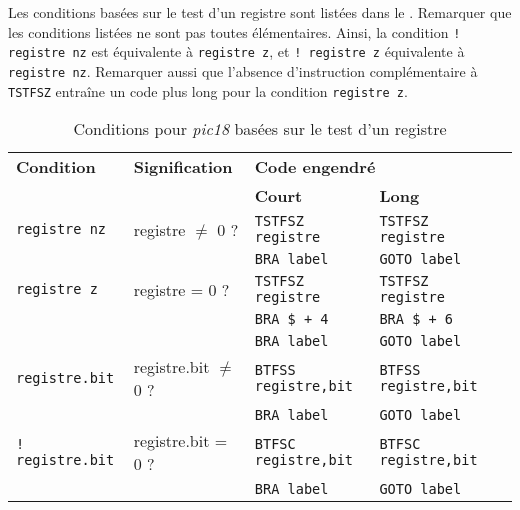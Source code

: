 Les conditions basées sur le test d'un registre sont listées dans le . Remarquer que les conditions listées ne sont pas toutes élémentaires. Ainsi, la condition \texttt{! registre nz} est équivalente à \texttt{registre z}, et \texttt{! registre z} équivalente à \texttt{registre nz}. Remarquer aussi que l'absence d'instruction complémentaire à \texttt{TSTFSZ} entraîne un code plus long pour la condition \texttt{registre z}.

\begin{table}[!ht]
  \centering
  \small
  \begin{tabular}{lllll}
    \textbf{Condition} & \textbf{Signification} & \multicolumn{2}{l}{\bf Code engendré}\\
                       &                        & \textbf{Court} & \textbf{Long}\\
    \hline
                           \texttt{registre nz}   & registre $\ne$ 0 ? &\texttt{TSTFSZ registre}  & \texttt{TSTFSZ registre}\\
                                                  &                 &\texttt{BRA label}        & \texttt{GOTO label}\\
    \rowcolor{\fondTableau}\texttt{registre z}    & registre = 0 ? &\texttt{TSTFSZ registre}  & \texttt{TSTFSZ registre}\\
    \rowcolor{\fondTableau}                       &                &\texttt{BRA \$ + 4}       & \texttt{BRA \$ + 6}  \\
    \rowcolor{\fondTableau}                       &                 &\texttt{BRA label}        & \texttt{GOTO label}\\
                           \texttt{registre.bit}  & registre.bit $\ne$ 0 ? &\texttt{BTFSS registre,bit}  & \texttt{BTFSS registre,bit}\\
                                                  &                     &\texttt{BRA label}        & \texttt{GOTO label}\\
    \rowcolor{\fondTableau}\texttt{! registre.bit}  & registre.bit = 0 ? &\texttt{BTFSC registre,bit}  & \texttt{BTFSC registre,bit}\\
    \rowcolor{\fondTableau}                         &                     &\texttt{BRA label}        & \texttt{GOTO label}\\
    \hline
  \end{tabular}
  \caption{Conditions pour \emph{pic18} basées sur le test d'un registre}
\end{table}


